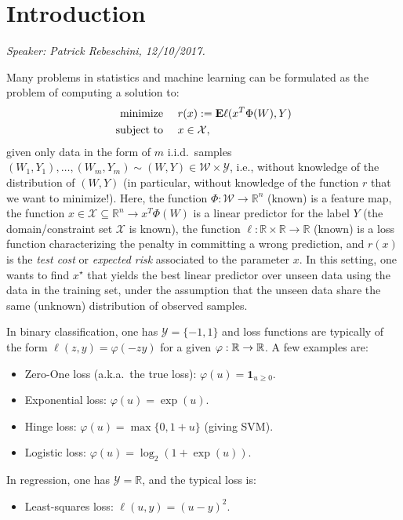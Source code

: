 
\chapter{Introduction}\label{sec:intro}
\emph{Speaker: Patrick Rebeschini, 12/10/2017.}\\

\label{sec:introduction}

Many problems in statistics and machine learning can be formulated as the problem of computing a solution to:
\begin{align}
	\begin{aligned}
		\text{minimize }\quad   & r(x) := \mathbf{E}\ell(x^T\Phi(W),Y)\\
		\text{subject to }\quad & x\in \mathcal{X},
	\end{aligned}
	\label{def:mainproblem}
\end{align}
given only data in the form of $m$ i.i.d.\ samples $(W_1,Y_1),\ldots,(W_m,Y_m) \sim (W,Y) \in \mathcal{W}\times\mathcal{Y}$, i.e., without knowledge of the distribution of $(W,Y)$ (in particular, without knowledge of the function $r$ that we want to minimize!). Here, the function $\Phi:\mathcal{W}\rightarrow\mathbb{R}^n$ (known) is a feature map, the function $x \in \mathcal{X}\subseteq\mathbb{R}^n \rightarrow x^T\Phi(W)$ is a linear predictor for the label $Y$ (the domain/constraint set $\mathcal{X}$ is known), the function $\ell:\mathbb{R}\times \mathbb{R} \rightarrow \mathbb{R}$ (known) is a loss function characterizing the penalty in committing a wrong prediction, and $r(x)$ is the \emph{test cost}  or \emph{expected risk} associated to the parameter $x$. In this setting, one wants to find $x^\star$ that yields the best linear predictor over unseen data using the data in the training set, under the assumption that the unseen data share the same (unknown) distribution of observed samples.

In binary classification, one has $\mathcal{Y}=\{-1,1\}$ and loss functions are typically of the form $\ell(z,y) = \varphi(-zy)$ for a given $\varphi:\mathbb{R}\rightarrow\mathbb{R}$. A few examples are:
\begin{itemize}
\item Zero-One loss (a.k.a.\ the true loss): $\varphi(u) = \mathbf{1}_{u\ge 0}$.
\item Exponential loss: $\varphi(u) = \exp(u)$.
\item Hinge loss: $\varphi(u) = \max\{0,1+u\}$ (giving SVM).
\item Logistic loss: $\varphi(u) = \log_2(1+\exp(u))$.
\end{itemize}
In regression, one has $\mathcal{Y}=\mathbb{R}$, and the typical loss is:
\begin{itemize}
\item Least-squares loss: $\ell(u,y) = (u-y)^2$.
\end{itemize}

